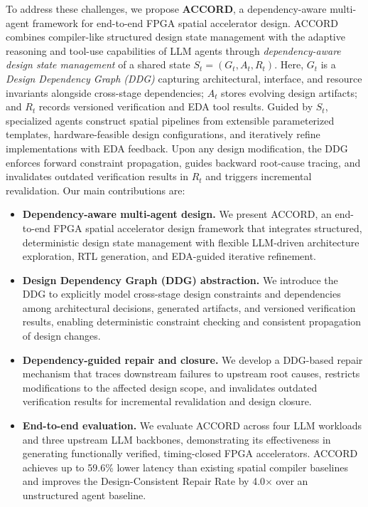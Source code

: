 \documentclass[9pt,conference]{IEEEtran}
\begin{document}
To address these challenges, we propose \textbf{ACCORD}, a dependency-aware multi-agent framework for end-to-end FPGA spatial accelerator design. ACCORD combines compiler-like structured design state management with the adaptive reasoning and tool-use capabilities of LLM agents through \emph{dependency-aware design state management} of a shared state $S_t=(G_t,A_t,R_t)$. Here, $G_t$ is a \emph{Design Dependency Graph (DDG)} capturing architectural, interface, and resource invariants alongside cross-stage dependencies; $A_t$ stores evolving design artifacts; and $R_t$ records versioned verification and EDA tool results. Guided by $S_t$, specialized agents construct spatial pipelines from extensible parameterized templates, hardware-feasible design configurations, and iteratively refine implementations with EDA feedback. Upon any design modification, the DDG enforces forward constraint propagation, guides backward root-cause tracing, and invalidates outdated verification results in $R_t$ and triggers incremental revalidation. Our main contributions are:
\begin{itemize}
\item \textbf{Dependency-aware multi-agent design.} We present ACCORD, an end-to-end FPGA spatial accelerator design framework that integrates structured, deterministic design state management with flexible LLM-driven architecture exploration, RTL generation, and EDA-guided iterative refinement.
\item \textbf{Design Dependency Graph (DDG) abstraction.} We introduce the DDG to explicitly model cross-stage design constraints and dependencies among architectural decisions, generated artifacts, and versioned verification results, enabling deterministic constraint checking and consistent propagation of design changes.
\item \textbf{Dependency-guided repair and closure.} We develop a DDG-based repair mechanism that traces downstream failures to upstream root causes, restricts modifications to the affected design scope, and invalidates outdated verification results for incremental revalidation and design closure.
\item \textbf{End-to-end evaluation.} We evaluate ACCORD across four LLM workloads and three upstream LLM backbones, demonstrating its effectiveness in generating functionally verified, timing-closed FPGA accelerators. ACCORD achieves up to 59.6\% lower latency than existing spatial compiler baselines and improves the Design-Consistent Repair Rate by 4.0$\times$ over an unstructured agent baseline. 
\end{itemize}
\end{document}
